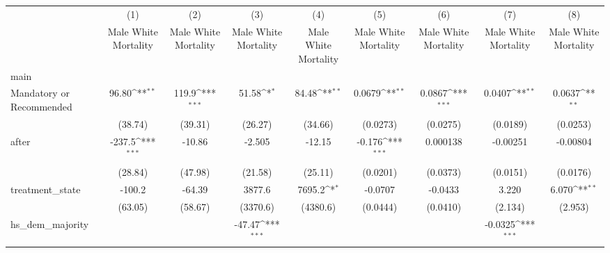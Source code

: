 {
\def\sym#1{\ifmmode^{#1}\else\(^{#1}\)\fi}
\begin{longtable}{l*{8}{c}}
\hline\hline\endfirsthead\hline\endhead\hline\endfoot\endlastfoot
                    &\multicolumn{1}{c}{(1)}&\multicolumn{1}{c}{(2)}&\multicolumn{1}{c}{(3)}&\multicolumn{1}{c}{(4)}&\multicolumn{1}{c}{(5)}&\multicolumn{1}{c}{(6)}&\multicolumn{1}{c}{(7)}&\multicolumn{1}{c}{(8)}\\
                    &\multicolumn{1}{c}{Male White Mortality}&\multicolumn{1}{c}{Male White Mortality}&\multicolumn{1}{c}{Male White Mortality}&\multicolumn{1}{c}{Male White Mortality}&\multicolumn{1}{c}{Male White Mortality}&\multicolumn{1}{c}{Male White Mortality}&\multicolumn{1}{c}{Male White Mortality}&\multicolumn{1}{c}{Male White Mortality}\\
\hline
main                &                     &                     &                     &                     &                     &                     &                     &                     \\
Mandatory or Recommended&       96.80\sym{**} &       119.9\sym{***}&       51.58\sym{*}  &       84.48\sym{**} &      0.0679\sym{**} &      0.0867\sym{***}&      0.0407\sym{**} &      0.0637\sym{**} \\
                    &     (38.74)         &     (39.31)         &     (26.27)         &     (34.66)         &    (0.0273)         &    (0.0275)         &    (0.0189)         &    (0.0253)         \\
[1em]
after               &      -237.5\sym{***}&      -10.86         &      -2.505         &      -12.15         &      -0.176\sym{***}&    0.000138         &    -0.00251         &    -0.00804         \\
                    &     (28.84)         &     (47.98)         &     (21.58)         &     (25.11)         &    (0.0201)         &    (0.0373)         &    (0.0151)         &    (0.0176)         \\
[1em]
treatment\_state     &      -100.2         &      -64.39         &      3877.6         &      7695.2\sym{*}  &     -0.0707         &     -0.0433         &       3.220         &       6.070\sym{**} \\
                    &     (63.05)         &     (58.67)         &    (3370.6)         &    (4380.6)         &    (0.0444)         &    (0.0410)         &     (2.134)         &     (2.953)         \\
[1em]
hs\_dem\_majority     &                     &                     &      -47.47\sym{***}&                     &                     &                     &     -0.0325\sym{***}&                     \\

\end{longtable}}
